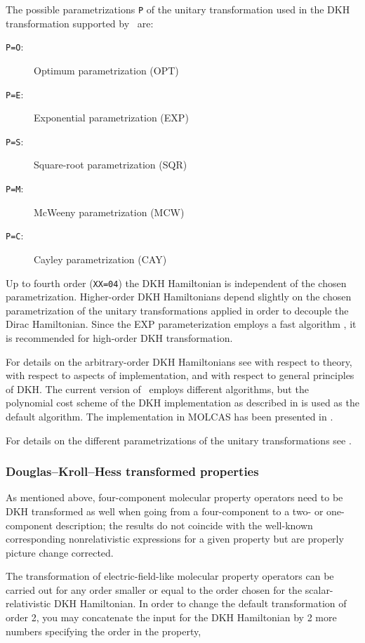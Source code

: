 The possible parametrizations {\tt P} of the unitary transformation used
in the DKH transformation supported by \molcas\ are:
\begin{description}
\item[{\tt P=O}:] Optimum parametrization (OPT)
\item[{\tt P=E}:] Exponential parametrization (EXP)
\item[{\tt P=S}:] Square-root parametrization (SQR)
\item[{\tt P=M}:] McWeeny parametrization (MCW)
\item[{\tt P=C}:] Cayley parametrization (CAY)
\end{description}

Up to fourth order ({\tt XX=04}) the DKH Hamiltonian is independent of the chosen
parametrization.
Higher-order DKH Hamiltonians depend slightly on the chosen parametrization of the unitary
transformations applied in order to decouple the Dirac Hamiltonian.
Since the EXP parameterization employs a fast algorithm \cite{DKH_polynomial}, it is recommended
for high-order DKH transformation.

For details on the arbitrary-order DKH Hamiltonians see \cite{DKH_Theory} with respect to theory,
\cite{DKH_Implementation} with respect to aspects of implementation, and
\cite{DKH_Principles} with respect to general principles of DKH.
The current version of \molcas\ employs different algorithms,
but the polynomial cost scheme of the DKH implementation as described in \cite{DKH_polynomial} is
used as the default algorithm. The implementation in MOLCAS has been presented in \cite{R2C_review}.

For details on the different parametrizations of the unitary transformations see \cite{DKH_Parameterization}.


\subsubsection{Douglas--Kroll--Hess transformed properties}

As mentioned above, four-component molecular property operators need to be DKH
transformed as well when going from a four-component to a two- or one-component description;
the results do not coincide with the well-known corresponding nonrelativistic expressions
for a given property but are properly picture change corrected.

The transformation of electric-field-like molecular property operators can be carried
out for any order smaller or equal to the order chosen for the scalar-relativistic DKH Hamiltonian.
In order to change the default transformation of order 2, you may concatenate the
input for the DKH Hamiltonian by 2 more numbers specifying the order in the property,

